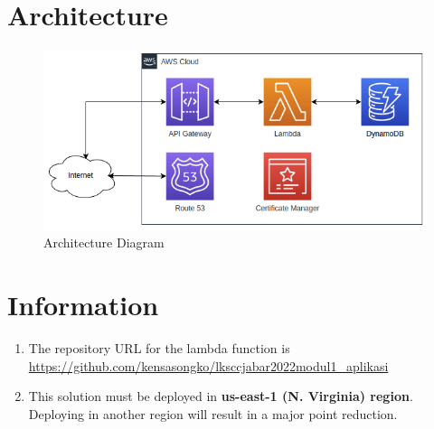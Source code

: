 \documentclass{article}
\begin{document}
\section{Architecture}
\begin{figure}[h]
\centering
\includegraphics[width=\textwidth]{modul1_architecture.png}
\caption{\label{fig:architecture}Architecture Diagram}
\end{figure}

\section{Information}

\begin{enumerate}
\item The repository URL for the lambda function is \href{https://github.com/kensasongko/lksccjabar2022modul1_aplikasi}{https://github.com/kensasongko/lksccjabar2022modul1\_aplikasi}
\item This solution must be deployed in \textbf{us-east-1 (N. Virginia) region}. Deploying in another region will result in a major point reduction.
\end{enumerate}
\end{document}
